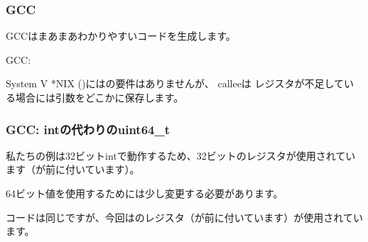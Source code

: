 \subsubsection{GCC}

\Optimizing GCCはまあまあわかりやすいコードを生成します。



\NonOptimizing GCC:




System V *NIX (\SysVABI)にはの要件はありませんが、 \gls{callee}は
レジスタが不足している場合には引数をどこかに保存します。

\subsubsection{GCC: intの代わりのuint64\_t}

私たちの例は32ビットintで動作するため、32ビットのレジスタが使用されています（が前に付いています）。 

64ビット値を使用するためには少し変更する必要があります。





コードは同じですが、今回はのレジスタ（が前に付いています）が使用されています。

